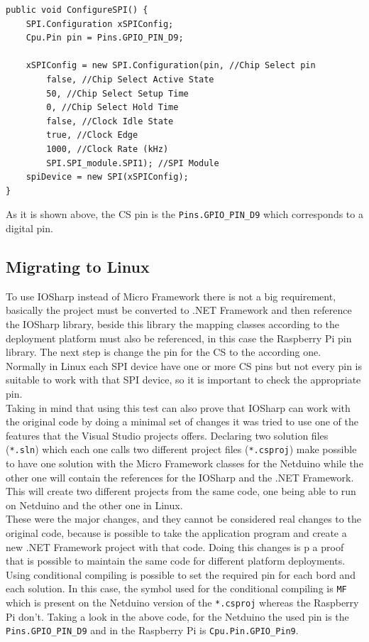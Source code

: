 \begin{lstlisting}[language=CSharp, caption={SPIApi.cs - Configuring SPI for the MFRC522 in Netduino Plus}]
public void ConfigureSPI() {
    SPI.Configuration xSPIConfig;
    Cpu.Pin pin = Pins.GPIO_PIN_D9;

    xSPIConfig = new SPI.Configuration(pin, //Chip Select pin
        false, //Chip Select Active State
        50, //Chip Select Setup Time
        0, //Chip Select Hold Time
        false, //Clock Idle State
        true, //Clock Edge
        1000, //Clock Rate (kHz)
        SPI.SPI_module.SPI1); //SPI Module
    spiDevice = new SPI(xSPIConfig);
}
\end{lstlisting}
As it is shown above, the \gls{CS} pin is the \verb!Pins.GPIO_PIN_D9! which corresponds to a digital pin.

\subsection{Migrating to Linux}\label{S:IOEx-SPI-Migrating-to-IOSharp}
To use IOSharp instead of Micro Framework there is not a big requirement, basically the project must be converted to .NET Framework and then reference the IOSharp library, beside this library the mapping classes according to the deployment platform must also be referenced, in this case the Raspberry Pi pin library. The next step is change the pin for the \gls{CS} to the according one. Normally in Linux each SPI device have one or more \gls{CS} pins but not every pin is suitable to work with that SPI device, so it is important to check the appropriate pin.
\\
Taking in mind that using this test can also prove that IOSharp can work with the original code by doing a minimal set of changes it was tried to use one of the features that the Visual Studio projects offers. Declaring two solution files (\verb!*.sln!) which each one calls two different project files (\verb!*.csproj!) make possible to have one solution with the Micro Framework classes for the Netduino while the other one will contain the references for the IOSharp and the .NET Framework. This will create two different projects from the same code, one being able to run on Netduino and the other one in Linux.
\\
These were the major changes, and they cannot be considered real changes to the original code, because is possible to take the application program and create a new .NET Framework project with that code. Doing this changes is p a proof that is possible to maintain the same code for different platform deployments.
\\
Using conditional compiling is possible to set the required pin for each bord and each solution. In this case, the symbol used for the conditional compiling is \verb!MF! which is present on the Netduino version of the \verb!*.csproj! whereas the Raspberry Pi don't. Taking a look in the above code, for the Netduino the used pin is the \verb!Pins.GPIO_PIN_D9! and in the Raspberry Pi is \verb!Cpu.Pin.GPIO_Pin9!.

